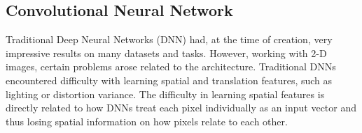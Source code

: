 \documentclass[oneside, english, bibtex]{kththesis}
\begin{document}







\subsection{Convolutional Neural Network}

Traditional Deep Neural Networks (DNN) had, at the time of creation, very impressive results on many datasets and tasks. However, working with 2-D images, certain problems arose related to the architecture. Traditional DNNs encountered difficulty with learning spatial and translation features, such as lighting or distortion variance. The difficulty in learning spatial features is directly related to how DNNs treat each pixel individually as an input vector and thus losing spatial information on how pixels relate to each other.
\end{document}
